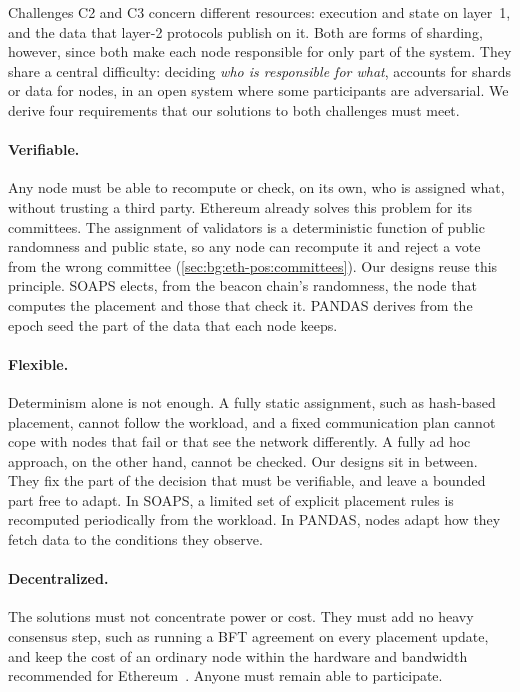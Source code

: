 Challenges C2 and C3 concern different resources: execution and state on layer~1, and the data that layer-2 protocols publish on it.
Both are forms of sharding, however, since both make each node responsible for only part of the system.
They share a central difficulty: deciding \emph{who is responsible for what}, accounts for shards or data for nodes, in an open system where some participants are adversarial.
We derive four requirements that our solutions to both challenges must meet.

\paragraph{Verifiable.}
Any node must be able to recompute or check, on its own, who is assigned what, without trusting a third party.
Ethereum already solves this problem for its committees.
The assignment of validators is a deterministic function of public randomness and public state, so any node can recompute it and reject a vote from the wrong committee (\autoref{sec:bg:eth-pos:committees}).
Our designs reuse this principle.
SOAPS elects, from the beacon chain's randomness, the node that computes the placement and those that check it.
PANDAS derives from the epoch seed the part of the data that each node keeps.

\paragraph{Flexible.}
Determinism alone is not enough.
A fully static assignment, such as hash-based placement, cannot follow the workload, and a fixed communication plan cannot cope with nodes that fail or that see the network differently.
A fully ad hoc approach, on the other hand, cannot be checked.
Our designs sit in between.
They fix the part of the decision that must be verifiable, and leave a bounded part free to adapt.
In SOAPS, a limited set of explicit placement rules is recomputed periodically from the workload.
In PANDAS, nodes adapt how they fetch data to the conditions they observe.

\paragraph{Decentralized.}
The solutions must not concentrate power or cost.
They must add no heavy consensus step, such as running a BFT agreement on every placement update, and keep the cost of an ordinary node within the hardware and bandwidth recommended for Ethereum~\cite{eip7870}.
Anyone must remain able to participate.

